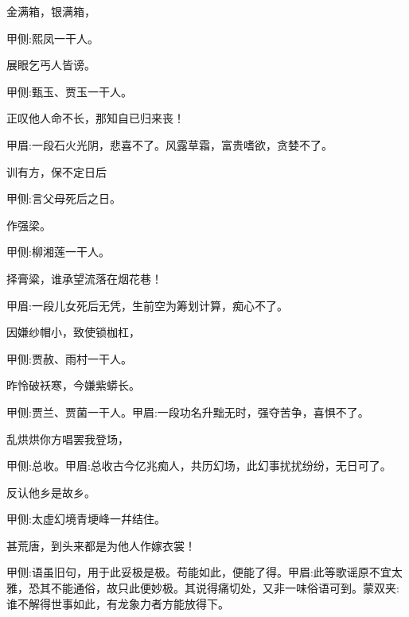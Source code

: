 \begin{poem}
    \begin{pl}金满箱，银满箱，\end{pl}\begin{note}甲侧:熙凤一干人。\end{note}

    \begin{pl}展眼乞丐人皆谤。\end{pl}\begin{note}甲侧:甄玉、贾玉一干人。\end{note}

    \begin{pl}正叹他人命不长，那知自已归来丧！\end{pl}\begin{note}甲眉:一段石火光阴，悲喜不了。风露草霜，富贵嗜欲，贪婪不了。\end{note}

    \begin{pl}训有方，保不定日后\end{pl}\begin{note}甲侧:言父母死后之日。\end{note}作强梁。\begin{note}甲侧:柳湘莲一干人。\end{note}

    \begin{pl}择膏粱，谁承望流落在烟花巷！\end{pl}\begin{note}甲眉:一段儿女死后无凭，生前空为筹划计算，痴心不了。\end{note}

    \begin{pl}因嫌纱帽小，致使锁枷杠，\end{pl}\begin{note}甲侧:贾赦、雨村一干人。\end{note}

    \begin{pl}昨怜破袄寒，今嫌紫蟒长。\end{pl}\begin{note}甲侧:贾兰、贾菌一干人。甲眉:一段功名升黜无时，强夺苦争，喜惧不了。\end{note}
    \begin{pl}乱烘烘你方唱罢我登场，\end{pl}\begin{note}甲侧:总收。甲眉:总收古今亿兆痴人，共历幻场，此幻事扰扰纷纷，无日可了。\end{note}

    \begin{pl}反认他乡是故乡。\end{pl}\begin{note}甲侧:太虚幻境青埂峰一幷结住。\end{note}

    \begin{pl}甚荒唐，到头来都是为他人作嫁衣裳！\end{pl}\begin{note}甲侧:语虽旧句，用于此妥极是极。苟能如此，便能了得。甲眉:此等歌谣原不宜太雅，恐其不能通俗，故只此便妙极。其说得痛切处，又非一味俗语可到。蒙双夹:谁不解得世事如此，有龙象力者方能放得下。\end{note}
\end{poem}


